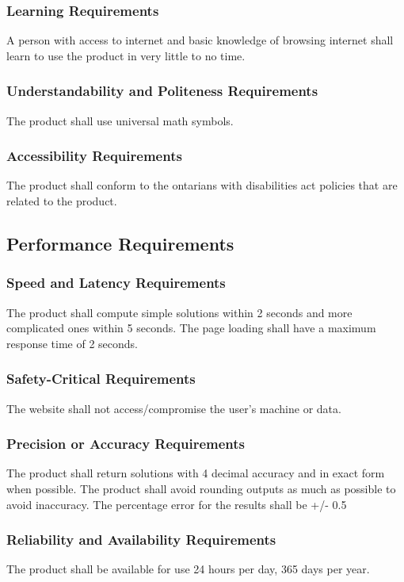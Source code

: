 \documentclass[11pt, oneside]{article}
\begin{document}
\subsubsection{Learning Requirements}
A person with access to internet and basic knowledge of browsing internet shall learn to use the product in very little to no time.


\subsubsection{Understandability and Politeness Requirements}
The product shall use universal math symbols.


\subsubsection{Accessibility Requirements}
The product shall conform to the ontarians with disabilities act policies that are related to the product.


\subsection{Performance Requirements}
\subsubsection{Speed and Latency Requirements}
The product shall compute simple solutions within 2 seconds and more complicated ones within 5 seconds. The page loading shall have a maximum response time of 2 seconds.


\subsubsection{Safety-Critical Requirements}
The website shall not access/compromise the user’s machine or data.


\subsubsection{Precision or Accuracy Requirements}
The product shall return solutions with 4 decimal accuracy and in exact form when possible. The product shall avoid rounding outputs as much as possible to avoid inaccuracy. The percentage error for the results shall be +/- 0.5%


\subsubsection{Reliability and Availability Requirements}
The product shall be available for use 24 hours per day, 365 days per year.
\end{document}
